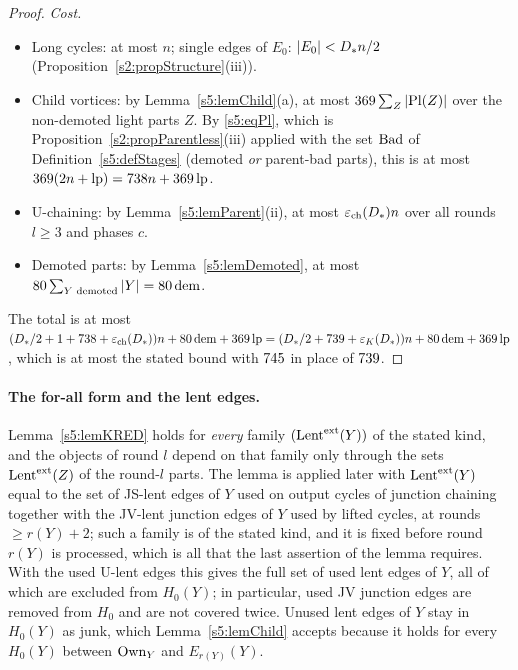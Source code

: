\begin{proof}
\emph{Cost.}
\begin{itemize}
\item Long cycles: at most $n$; single edges of $E_0$: $|E_0|<D_{*} n/2$ (Proposition~\ref{s2:propStructure}(iii)).
\item Child vortices: by Lemma~\ref{s5:lemChild}(a), at most $369\sum_Z|\mathrm{Pl}(Z)|$ over the non-demoted light parts $Z$. By \eqref{s5:eqPl}, which is Proposition~\ref{s2:propParentless}(iii) applied with the set $\mathrm{Bad}$ of Definition~\ref{s5:defStages} (demoted \emph{or} parent-bad parts), this is at most $369(2n+\mathrm{lp})=738n+369\,\mathrm{lp}$.
\item U-chaining: by Lemma~\ref{s5:lemParent}(ii), at most $\varepsilon_{\mathrm{ch}}(D_{*})n$ over all rounds $l\ge3$ and phases $c$.
\item Demoted parts: by Lemma~\ref{s5:lemDemoted}, at most $80\sum_{Y\text{ demoted}}|Y|=80\,\mathrm{dem}$.
\end{itemize}
The total is at most $(D_{*}/2+1+738+\varepsilon_{\mathrm{ch}}(D_{*}))n+80\,\mathrm{dem}+369\,\mathrm{lp}=(D_{*}/2+739+\varepsilon_{K}(D_{*}))n+80\,\mathrm{dem}+369\,\mathrm{lp}$, which is at most the stated bound with $745$ in place of $739$.
\end{proof}

\paragraph{The for-all form and the lent edges.} Lemma~\ref{s5:lemKRED} holds for \emph{every} family $(\mathrm{Lent}^{\mathrm{ext}}(Y))$ of the stated kind, and the objects of round $l$ depend on that family only through the sets $\mathrm{Lent}^{\mathrm{ext}}(Z)$ of the round-$l$ parts. The lemma is applied later with $\mathrm{Lent}^{\mathrm{ext}}(Y)$ equal to the set of JS-lent edges of $Y$ used on output cycles of junction chaining together with the JV-lent junction edges of $Y$ used by lifted cycles, at rounds $\ge r(Y)+2$; such a family is of the stated kind, and it is fixed before round $r(Y)$ is processed, which is all that the last assertion of the lemma requires. With the used U-lent edges this gives the full set of used lent edges of $Y$, all of which are excluded from $H_0(Y)$; in particular, used JV junction edges are removed from $H_0$ and are not covered twice. Unused lent edges of $Y$ stay in $H_0(Y)$ as junk, which Lemma~\ref{s5:lemChild} accepts because it holds for every $H_0(Y)$ between $\mathrm{Own}_Y$ and $E_{r(Y)}(Y)$.

